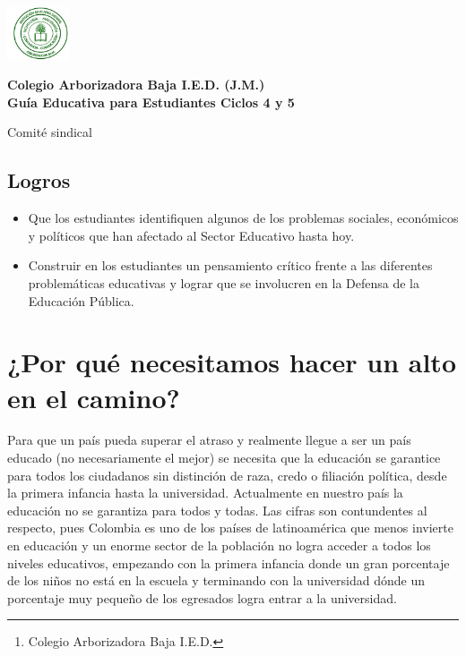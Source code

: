 \documentclass[10pt,twoside]{article}
\author{Comité sindical\thanks{Colegio Arborizadora Baja I.E.D.}}
\date{}
\begin{document}
\begin{minipage}{.2\textwidth}
\includegraphics[height=1.55cm]{Images/logo-colegio.png}\end{minipage}
\begin{minipage}{.75\textwidth}
\begin{center}
\textbf{\large Colegio Arborizadora Baja I.E.D. (J.M.)}\\
\textbf{\large Guía Educativa para Estudiantes Ciclos 4 y 5}\\
\end{center}
\end{minipage}\hfill
\vspace*{-10pt}
\begin{center}
\large Comité sindical
\end{center}
\vspace*{-10pt}
\subsection*{Logros}
\begin{itemize}
\item Que los estudiantes identifiquen algunos de los problemas sociales, económicos y políticos  que han afectado al Sector Educativo hasta hoy.
\item Construir en los estudiantes un pensamiento crítico frente a las diferentes problemáticas educativas y lograr que se involucren en la Defensa de la Educación Pública.
\end{itemize}
\section*{¿Por qué necesitamos hacer un alto en el camino?}
Para que un país pueda superar el atraso y realmente llegue a ser un país educado (no necesariamente el mejor) se necesita que la educación se garantice para todos los ciudadanos sin distinción de raza, credo o filiación política, desde la primera infancia hasta la universidad. Actualmente en nuestro país la educación no se garantiza para todos y todas. Las cifras son contundentes al respecto, pues Colombia es uno de los países de latinoamérica que menos invierte en educación y un enorme sector de la población no logra acceder a todos los niveles educativos, empezando con la primera infancia donde un gran porcentaje de los niños no está en la escuela y terminando con la universidad dónde un porcentaje muy pequeño de los egresados logra entrar a la universidad.
\end{document}
